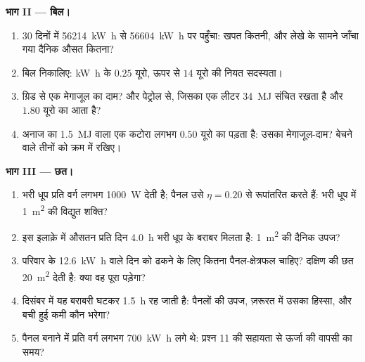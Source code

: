 \begin{problem}
\medskip
\noindent\textbf{भाग II --- बिल।}
\begin{enumerate}[resume]
  \item 30 दिनों में  \qty{56214}{kW.h} से \qty{56604}{kW.h} पर पहुँचा: खपत कितनी, और
        लेखे के सामने जाँचा गया दैनिक औसत कितना?
  \item बिल निकालिए: \unit{kW.h} के $0.25$ यूरो, ऊपर से $14$ यूरो की
        नियत सदस्यता।
  \item ग्रिड से एक मेगाजूल का दाम? और पेट्रोल से, जिसका एक लीटर \qty{34}{MJ}
        संचित रखता है और $1.80$ यूरो का आता है?
  \item अनाज का \qty{1.5}{MJ} वाला एक कटोरा लगभग $0.50$ यूरो का पड़ता है:
        उसका मेगाजूल-दाम?  बेचने वाले तीनों को क्रम में
        रखिए।
\end{enumerate}

\medskip
\noindent\textbf{भाग III --- छत।}
\begin{enumerate}[resume]
  \item भरी धूप प्रति वर्ग  लगभग \qty{1000}{W} देती है; पैनल उसे
        $\eta = 0.20$ से रूपांतरित करते हैं: भरी धूप में \qty{1}{m^2} की विद्युत
        शक्ति?
  \item इस इलाक़े में औसतन प्रति दिन \qty{4.0}{h} भरी धूप के बराबर मिलता है:
        \qty{1}{m^2} की दैनिक उपज?
  \item परिवार के \qty{12.6}{kW.h} वाले दिन को ढकने के लिए कितना पैनल-क्षेत्रफल
        चाहिए? दक्षिण की छत \qty{20}{m^2} देती है: क्या वह पूरा पड़ेगा?
  \item दिसंबर में यह बराबरी घटकर \qty{1.5}{h} रह जाती है: पैनलों की उपज,
        ज़रूरत में उसका हिस्सा, और बची हुई कमी कौन भरेगा?
  \item पैनल बनाने में प्रति वर्ग  लगभग \qty{700}{kW.h} लगे थे:
        प्रश्न 11 की सहायता से ऊर्जा की वापसी का समय?
\end{enumerate}


\end{problem}
